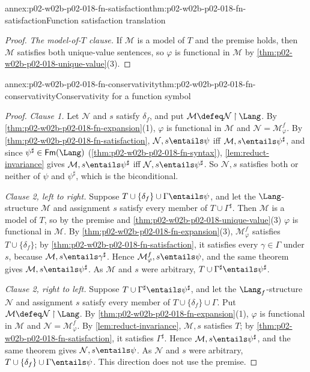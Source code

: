 \begin{annexitem}{annex:p02-w02b-p02-018-fn-satisfaction}{thm:p02-w02b-p02-018-fn-satisfaction}{Function satisfaction translation}
\begin{proof}
\emph{The model-of-\(T\) clause.}  If \(\mathcal M\) is a model of \(T\) and
the premise holds, then \(\mathcal M\) satisfies both unique-value
sentences, so \(\varphi\) is functional in \(\mathcal M\) by
\cref{thm:p02-w02b-p02-018-unique-value}(3).
\end{proof}
\end{annexitem}

\begin{annexitem}{annex:p02-w02b-p02-018-fn-conservativity}{thm:p02-w02b-p02-018-fn-conservativity}{Conservativity for a function symbol}
\begin{proof}
\emph{Clause 1.}  Let \(\mathcal N\) and \(s\) satisfy \(\delta_f\), and put
\(\mathcal M\defeq\mathcal N\mathbin{\upharpoonright}\Lang\).  By
\cref{thm:p02-w02b-p02-018-fn-expansion}(1), \(\varphi\) is functional
in \(\mathcal M\) and \(\mathcal N=\mathcal M^{f}_{\varphi}\).  By
\cref{thm:p02-w02b-p02-018-fn-satisfaction},
\(\mathcal N,s\entails\psi\) iff \(\mathcal M,s\entails\psi^{\sharp}\), and
since \(\psi^{\sharp}\in\mathsf{Fm}(\Lang)\)
(\cref{thm:p02-w02b-p02-018-fn-syntax}),
\cref{lem:reduct-invariance} gives \(\mathcal M,s\entails\psi^{\sharp}\) iff
\(\mathcal N,s\entails\psi^{\sharp}\).  So \(\mathcal N,s\) satisfies both
or neither of \(\psi\) and \(\psi^{\sharp}\), which is the biconditional.

\emph{Clause 2, left to right.}  Suppose
\(T\cup\{\delta_f\}\cup\Gamma\entails\psi\), and let the
\(\Lang\)-structure \(\mathcal M\) and assignment \(s\) satisfy every member
of \(T\cup\Gamma^{\sharp}\).  Then \(\mathcal M\) is a model of \(T\), so by
the premise and \cref{thm:p02-w02b-p02-018-unique-value}(3) \(\varphi\) is
functional in \(\mathcal M\).  By
\cref{thm:p02-w02b-p02-018-fn-expansion}(3),
\(\mathcal M^{f}_{\varphi}\) satisfies \(T\cup\{\delta_f\}\); by
\cref{thm:p02-w02b-p02-018-fn-satisfaction}, it satisfies every
\(\gamma\in\Gamma\) under \(s\), because \(\mathcal M,s\entails\gamma^{\sharp}\).
Hence \(\mathcal M^{f}_{\varphi},s\entails\psi\), and the same theorem gives
\(\mathcal M,s\entails\psi^{\sharp}\).  As \(\mathcal M\) and \(s\) were
arbitrary, \(T\cup\Gamma^{\sharp}\entails\psi^{\sharp}\).

\emph{Clause 2, right to left.}  Suppose
\(T\cup\Gamma^{\sharp}\entails\psi^{\sharp}\), and let the
\(\Lang_f\)-structure \(\mathcal N\) and assignment \(s\) satisfy every
member of \(T\cup\{\delta_f\}\cup\Gamma\).  Put
\(\mathcal M\defeq\mathcal N\mathbin{\upharpoonright}\Lang\).  By
\cref{thm:p02-w02b-p02-018-fn-expansion}(1), \(\varphi\) is functional
in \(\mathcal M\) and \(\mathcal N=\mathcal M^{f}_{\varphi}\).  By
\cref{lem:reduct-invariance}, \(\mathcal M,s\) satisfies \(T\); by
\cref{thm:p02-w02b-p02-018-fn-satisfaction}, it satisfies
\(\Gamma^{\sharp}\).  Hence \(\mathcal M,s\entails\psi^{\sharp}\), and the
same theorem gives \(\mathcal N,s\entails\psi\).  As \(\mathcal N\) and
\(s\) were arbitrary, \(T\cup\{\delta_f\}\cup\Gamma\entails\psi\).  This
direction does not use the premise.


\end{proof}
\end{annexitem}
